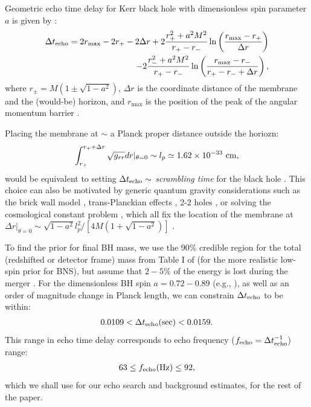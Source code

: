 \documentclass[a4paper,11pt]{article}
\newcommand{\be}{\begin{equation}}
\newcommand{\ee}{\end{equation}}
\begin{document}
Geometric echo time delay for Kerr black hole with dimensionless spin parameter $a$ is given by \cite{Abedi:2016hgu}:
\begin{eqnarray}
\Delta t_{\rm echo}
=2r_{\rm max}-2r_{+}-2\Delta r 
+ 2\frac{r_{+}^{2}+a^{2}M^2}{r_{+}-r_{-}} \ln\left(\frac{r_{\rm max}-r_{+}}{\Delta r}\right) \nonumber \\
\ \ \ \ \ \ \ \ \ \ \ \ \ \ - 2\frac{r_{-}^{2}+a^{2}M^2}{r_{+}-r_{-}} \ln\left(\frac{r_{\rm max}-r_{-}}{r_{+}-r_{-}+\Delta r}\right),
\end{eqnarray}
where $r_{\pm}=M(1\pm \sqrt{1-a^{2}})$,  $\Delta r$ is the coordinate distance of the membrane and the (would-be) horizon, and $r_{\max}$ is the position of the peak of the angular momentum barrier   \cite{Abedi:2016hgu}. 

Placing the membrane at $\sim$ a Planck proper distance outside the horiozn: 
\be
\int_{r_{+}}^{r_{+}+\Delta r} \sqrt{g_{rr}} dr |_{\theta=0} \sim l_p \simeq 1.62 \times 10^{-33}~ {\rm cm},
\ee
 would be equivalent to setting $\Delta t_{\rm echo} \sim$ {\it scrambling time} for the black hole \cite{Hayden:2007cs,Sekino:2008he,Harlow:2014yka,Harlow:2013tf}. This choice can also be motivated by generic quantum gravity considerations such as the brick wall model \cite{THOOFT1985727},  trans-Planckian effects \cite{Khriplovich,York:1983zb}, 2-2 holes \cite{Holdom:2016nek}, or solving the cosmological constant problem \cite{PrescodWeinstein:2009mp}, which all fix the location of the membrane at $\Delta r|_{\theta=0} \sim{\sqrt{1-a^{2}} l_{p}^{2}}/{[4M(1+\sqrt{1-a^{2}})]}$ \cite{Abedi:2016hgu}. 


To find the prior for final BH mass, we use the  90\% credible region for the total (redshifted or detector frame) mass from Table I of \cite{TheLIGOScientific:2017qsa} (for the more realistic low-spin prior for BNS), but assume that $2-5\%$ of the energy is lost during the merger \cite{Zappa:2017xba}.  For the dimensionless BH spin $a=0.72-0.89$ (e.g., \cite{Kastaun:2013mv}), as well as an order of magnitude change in Planck length, we can constrain $\Delta t_{\rm echo}$ to be within:
\begin{eqnarray}
0.0109<\Delta t_{{\rm echo}}({\rm sec})<0.0159.
 \end{eqnarray}
This range in echo time delay corresponds to echo frequency ($f_{\rm echo} = \Delta t_{\rm echo}^{-1}$) range:
\begin{eqnarray}
63 \leq f_{{\rm echo} }({\rm Hz}) \leq 92, \label{f_prior}
 \end{eqnarray}
which we shall use for our echo search and background estimates, for the rest of the paper.
\end{document}
